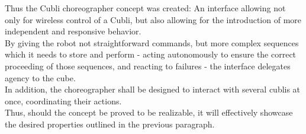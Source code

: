 Thus the Cubli choreographer concept was created: An interface allowing not only for wireless control of a Cubli, but also allowing for the introduction of more independent and responsive behavior.\\

By giving the robot not straightforward commands, but more complex sequences which it needs to store and perform - acting autonomously to ensure the correct proceeding of those sequences, and reacting to failures - the interface delegates agency to the cube.\\

In addition, the choreographer shall be designed to interact with several cublis at once, coordinating their actions.\\

Thus, should the concept be proved to be realizable, it will effectively showcase the desired properties outlined in the previous paragraph.



